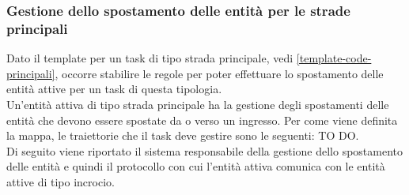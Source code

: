 \subsubsection{Gestione dello spostamento delle entità per le strade principali}
Dato il template per un task di tipo strada principale, vedi \ref{template-code-principali}, occorre stabilire le regole per poter effettuare lo spostamento delle entità attive per un task di questa tipologia.\\
Un'entità attiva di tipo strada principale ha la gestione degli spostamenti delle entità che devono essere spostate da o verso un ingresso. Per come viene definita la mappa, le traiettorie che il task deve gestire sono le seguenti: TO DO.\\
Di seguito viene riportato il sistema responsabile della gestione dello spostamento delle entità e quindi il protocollo con cui l'entità attiva comunica con le entità attive di tipo incrocio. 
